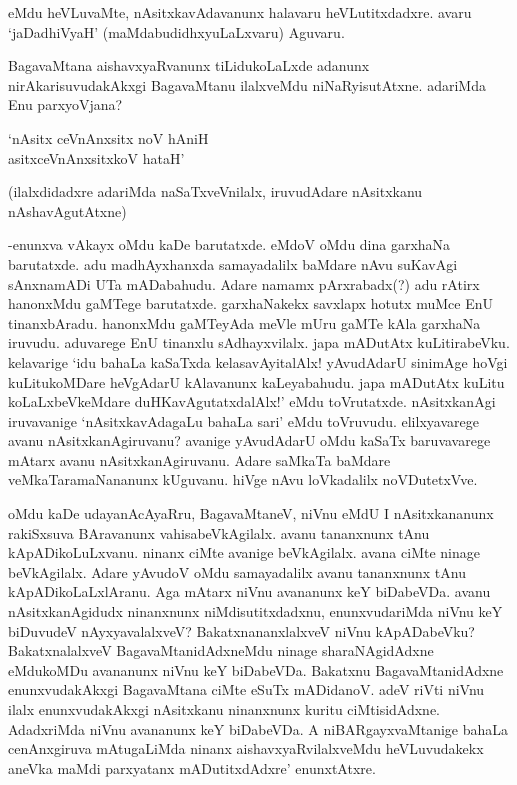 eMdu heVLuvaMte, nAsitxkavAdavanunx halavaru heVLutitxdadxre. avaru `jaDadhiVyaH' (maMdabudidhxyuLaLxvaru) Aguvaru.

BagavaMtana aishavxyaRvanunx tiLidukoLaLxde adanunx nirAkarisuvudakAkxgi BagavaMtanu ilalxveMdu niNaRyisutAtxne. adariMda Enu parxyoVjana?

\begin{shloka}
`nAsitx ceVnAnxsitx noV hAniH\\
asitxceVnAnxsitxkoV hataH'
\end{shloka}

(ilalxdidadxre adariMda naSaTxveVnilalx, iruvudAdare nAsitxkanu nAshavAgutAtxne)

-enunxva vAkayx oMdu kaDe barutatxde. eMdoV oMdu dina garxhaNa barutatxde. adu madhAyxhanxda samayadalilx baMdare nAvu suKavAgi sAnxnamADi UTa mADabahudu. Adare namamx pArxrabadx(?) adu rAtirx hanonxMdu gaMTege barutatxde. garxhaNakekx savxlapx hotutx muMce EnU tinanxbAradu. hanonxMdu gaMTeyAda meVle mUru gaMTe kAla garxhaNa iruvudu. aduvarege EnU tinanxlu sAdhayxvilalx. japa mADutAtx kuLitirabeVku. kelavarige `idu bahaLa kaSaTxda kelasavAyitalAlx! yAvudAdarU sinimAge hoVgi kuLitukoMDare heVgAdarU kAlavanunx kaLeyabahudu. japa mADutAtx kuLitu koLaLxbeVkeMdare duHKavAgutatxdalAlx!' eMdu toVrutatxde. nAsitxkanAgi iruvavanige `nAsitxkavAdagaLu bahaLa sari' eMdu toVruvudu. elilxyavarege avanu nAsitxkanAgiruvanu? avanige yAvudAdarU oMdu kaSaTx baruvavarege mAtarx avanu nAsitxkanAgiruvanu. Adare saMkaTa baMdare veMkaTaramaNananunx kUguvanu. hiVge nAvu loVkadalilx noVDutetxVve.

oMdu kaDe udayanAcAyaRru, BagavaMtaneV, niVnu eMdU I nAsitxkananunx rakiSxsuva BAravanunx vahisabeVkAgilalx. avanu tananxnunx tAnu kApADikoLuLxvanu. ninanx ciMte avanige beVkAgilalx. avana ciMte ninage beVkAgilalx. Adare yAvudoV oMdu samayadalilx avanu tananxnunx tAnu kApADikoLaLxlAranu. Aga mAtarx niVnu avananunx keY biDabeVDa. avanu nAsitxkanAgidudx ninanxnunx niMdisutitxdadxnu, enunxvudariMda niVnu keY biDuvudeV nAyxyavalalxveV? BakatxnananxlalxveV niVnu kApADabeVku? BakatxnalalxveV BagavaMtanidAdxneMdu ninage sharaNAgidAdxne eMdukoMDu avananunx niVnu keY biDabeVDa. Bakatxnu BagavaMtanidAdxne enunxvudakAkxgi BagavaMtana ciMte eSuTx mADidanoV. adeV riVti niVnu ilalx enunxvudakAkxgi nAsitxkanu ninanxnunx kuritu ciMtisidAdxne. AdadxriMda niVnu avananunx keY biDabeVDa. A niBARgayxvaMtanige bahaLa cenAnxgiruva mAtugaLiMda ninanx aishavxyaRvilalxveMdu heVLuvudakekx aneVka maMdi parxyatanx mADutitxdAdxre' enunxtAtxre.

